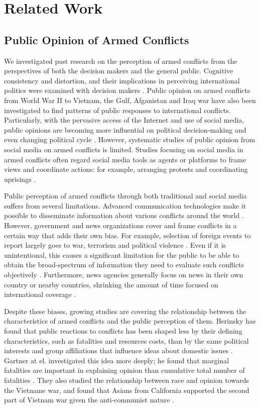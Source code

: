 \section{Related Work}
\subsection{Public Opinion of Armed Conflicts}
We investigated past research on the perception of armed conflicts from the perspectives of both the decision makers and the general public. Cognitive consistency and distortion, and their implications in perceiving international politics were examined with decision makers \cite{Jervis1976}. Public opinion on armed conflicts from World War II to Vietnam, the Gulf, Afganistan and Iraq war have also been investigated to find patterns of public responses to international conflicts. Particularly, with the pervasive access of the Internet and use of social media, public opinions are becoming more influential on political decision-making and even changing political cycle \cite{Shirky2011}. However, systematic studies of public opinion from social media on armed conflicts is limited. Studies focusing on social media in armed conflicts often regard social media tools as agents or platforms to frame views and coordinate actions: for example, arranging protests and coordinating uprisings \cite{Lim2012}.

Public perception of armed conflicts through both traditional and social media suffers from several limitations. Advanced communication technologies make it possible to disseminate information about various conflicts around the world \cite{Sacco2015}. However, government and news organizations cover and frame conflicts in a certain way that adds their own bias. For example, selection of foreign events to report largely goes to war, terrorism and political violence \cite{Nossek2004}. Even if it is unintentional, this causes a significant limitation for the public to be able to obtain the broad-spectrum of information they need to evaluate such conflicts objectively \cite{Nelson1997}. Furthermore, news agencies generally focus on news in their own country or nearby countries, shrinking the amount of time focused on international coverage \cite{Seib2004}.

Despite these biases, growing studies are covering the relationship between the characteristics of armed conflicts and the public perception of them. Berinsky has found that public reactions to conflicts has been shaped less by their defining characteristics, such as fatalities and resources costs, than by the same political interests and group affiliations that influence ideas about domestic issues \cite{Berinsky2009}. Gartner at el. investigated this idea more deeply; he found that marginal fatalities are important in explaining opinion than cumulative total number of fatalities \cite{Gartner1998}. They also studied the relationship between race and opinion towards the Vietname war, and found that Asians from California supported the second part of Vietnam war given the anti-communist nature \cite{Gartner2000}. 

